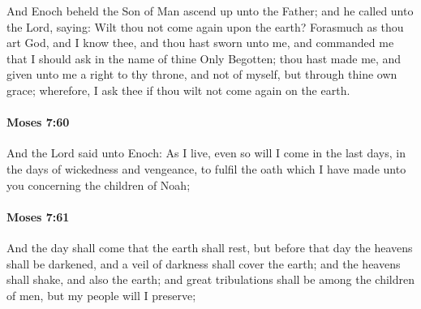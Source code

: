 			And Enoch beheld the Son of Man ascend up unto the Father; and he called unto the Lord, saying: Wilt thou not come again upon the earth? Forasmuch as thou art God, and I know thee, and thou hast sworn unto me, and commanded me that I should ask in the name of thine Only Begotten; thou hast made me, and given unto me a right to thy throne, and not of myself, but through thine own grace; wherefore, I ask thee if thou wilt not come again on the earth.


		\paragraph{Moses 7:60} %
			\label{MOSES-7-60}

			And the Lord said unto Enoch: As I live, even so will I come in the last days, in the days of wickedness and vengeance, to fulfil the oath which I have made unto you concerning the children of Noah;


		\paragraph{Moses 7:61} %
			\label{MOSES-7-61}

			And the day shall come that the earth shall rest, but before that day the heavens shall be darkened, and a veil of darkness shall cover the earth; and the heavens shall shake, and also the earth; and great tribulations shall be among the children of men, but my people will I preserve;

